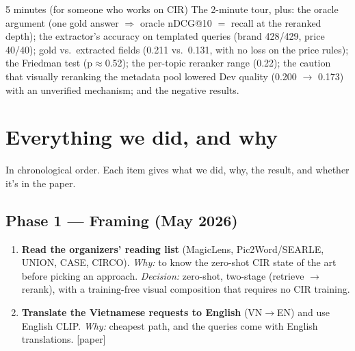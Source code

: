 \documentclass[11pt]{article}
\newcommand{\inpaper}{\textcolor{accent}{\small[paper]}}
\begin{document}
\begin{say}{5 minutes (for someone who works on CIR)}
The 2-minute tour, plus: the oracle argument (one gold answer $\Rightarrow$ oracle nDCG@10
$=$ recall at the reranked depth); the extractor's accuracy on templated queries
(brand 428/429, price 40/40); gold vs.\ extracted fields (0.211 vs.\ 0.131, with no loss
on the price rules); the Friedman test (p$\approx$0.52); the per-topic reranker range
(0.22); the caution that visually reranking the metadata pool lowered Dev quality
(0.200 $\to$ 0.173) with an unverified mechanism; and the negative results.
\end{say}

\section{Everything we did, and why}
In chronological order. Each item gives what we did, why, the result, and whether it's in
the paper.

\subsection*{Phase 1 --- Framing (May 2026)}
\begin{enumerate}[leftmargin=*]
  \item \textbf{Read the organizers' reading list} (MagicLens, Pic2Word/SEARLE, UNION, CASE,
        CIRCO). \emph{Why:} to know the zero-shot CIR state of the art before picking an approach.
        \emph{Decision:} zero-shot, two-stage (retrieve $\to$ rerank), with a training-free visual composition
        that requires no CIR training.
  \item \textbf{Translate the Vietnamese requests to English} (VN$\to$EN) and use English CLIP.
        \emph{Why:} cheapest path, and the queries come with English translations.
        \inpaper
\end{enumerate}
\end{document}
